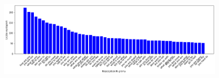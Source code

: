 \begin{figure}[t]
\centering\includegraphics[width=\textwidth]{figures/semeval_3_gram.png}
\label{rys:semeval_3_gram}
\end{figure}
